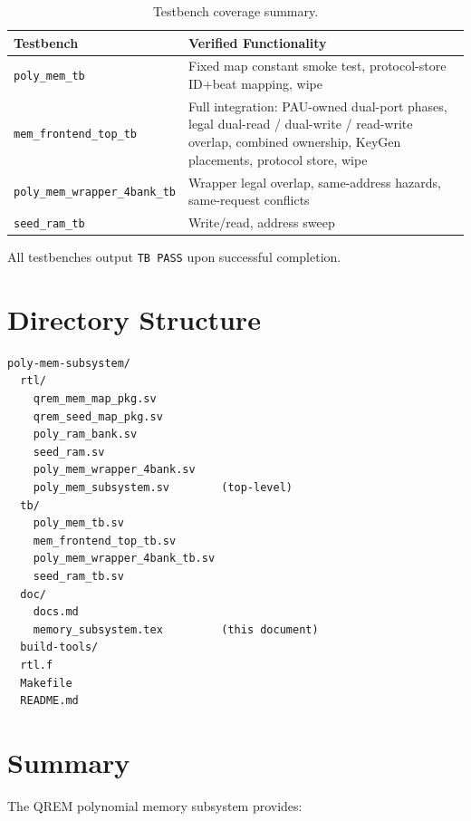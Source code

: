 \documentclass[11pt,letterpaper]{article}
\begin{document}
\begin{table}[H]
\centering
\caption{Testbench coverage summary.}
\label{tab:tb}
\begin{tabular}{@{}ll@{}}
\toprule
\textbf{Testbench} & \textbf{Verified Functionality} \\
\midrule
\texttt{poly\_mem\_tb}
  & Fixed map constant smoke test, protocol-store ID+beat mapping, wipe \\
\texttt{mem\_frontend\_top\_tb}
  & Full integration: PAU-owned dual-port phases, legal dual-read /
    dual-write / read-write overlap, combined ownership, KeyGen placements,
    protocol store, wipe \\
\texttt{poly\_mem\_wrapper\_4bank\_tb}
  & Wrapper legal overlap, same-address hazards, same-request conflicts \\
\texttt{seed\_ram\_tb}
  & Write/read, address sweep \\
\bottomrule
\end{tabular}
\end{table}

All testbenches output \texttt{TB PASS} upon successful completion.

\section{Directory Structure}
\label{sec:dir}

\begin{lstlisting}[basicstyle=\ttfamily\small, frame=none, numbers=none]
poly-mem-subsystem/
  rtl/
    qrem_mem_map_pkg.sv
    qrem_seed_map_pkg.sv
    poly_ram_bank.sv
    seed_ram.sv
    poly_mem_wrapper_4bank.sv
    poly_mem_subsystem.sv        (top-level)
  tb/
    poly_mem_tb.sv
    mem_frontend_top_tb.sv
    poly_mem_wrapper_4bank_tb.sv
    seed_ram_tb.sv
  doc/
    docs.md
    memory_subsystem.tex         (this document)
  build-tools/
  rtl.f
  Makefile
  README.md
\end{lstlisting}

\section{Summary}
\label{sec:summary}

The QREM polynomial memory subsystem provides:
\end{document}
